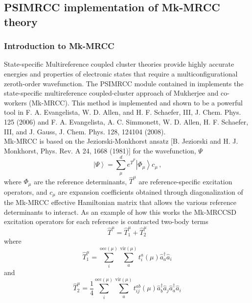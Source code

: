 \subsection{PSIMRCC implementation of Mk-MRCC theory} \label{sec:psimrcc}
\renewcommand{\optionname}[2]{\texttt{\nameref{op-#2-#1}}}

\subsubsection{Introduction to Mk-MRCC}
State-specific Multireference coupled cluster theories provide highly accurate energies and properties of electronic states that require a multiconfigurational zeroth-order wavefunction.  The PSIMRCC module contained in \PSIfour implements the state-specific multireference coupled-cluster approach of Mukherjee and co-workers (Mk-MRCC). This method is implemented and shown to be a powerful tool in F. A. Evangelista, W. D. Allen, and H. F. Schaefer, III, J. Chem. Phys. 125 (2006) and F. A. Evangelista, A. C. Simmonett, W. D. Allen, H. F. Schaefer, III, and J. Gauss, J. Chem. Phys. 128, 124104 (2008).    
\\
Mk-MRCC is based on the Jeziorski-Monkhorst ansatz [B. Jeziorski and H. J. Monkhorst, Phys. Rev. A 24, 1668 (1981)] for the wavefunction, $\Psi$
\begin{equation*}
\left| \Psi \right \rangle = \sum_\mu^d e^{\hat{T}^\mu} \left| \Phi_\mu \right\rangle c_\mu \, \text{,}
\end{equation*}
where $\Phi_\mu$ are the reference determinants, $\hat{T}^\mu$ are reference-specific excitation operators, and $c_\mu$ are expansion coefficients obtained through diagonalization of the Mk-MRCC effective Hamiltonian matrix that allows the various reference determinants to interact. As an example of how this works the Mk-MRCCSD excitation operators for each reference is contracted two-body terms
\begin{equation*}
\hat{T}^\mu = \hat{T}^\mu_1 + \hat{T}^\mu_2
\end{equation*} 
where
\begin{equation*}
\hat{T}^\mu_1 = \sum_i^{\textrm{occ}(\mu)} \sum_a^{\textrm{vir}(\mu)} t_i^a (\mu) \hat{a}^\dagger_a \hat{a}_i
\end{equation*}
and
\begin{equation*}
\hat{T}^\mu_2 =\frac{1}{4} \sum_i^{\textrm{occ}(\mu)} \sum_a^{\textrm{vir}(\mu)} t_{ij}^{ab} (\mu) \hat{a}^\dagger_b \hat{a}_j \hat{a}^\dagger_a \hat{a}_i  
\end{equation*}

